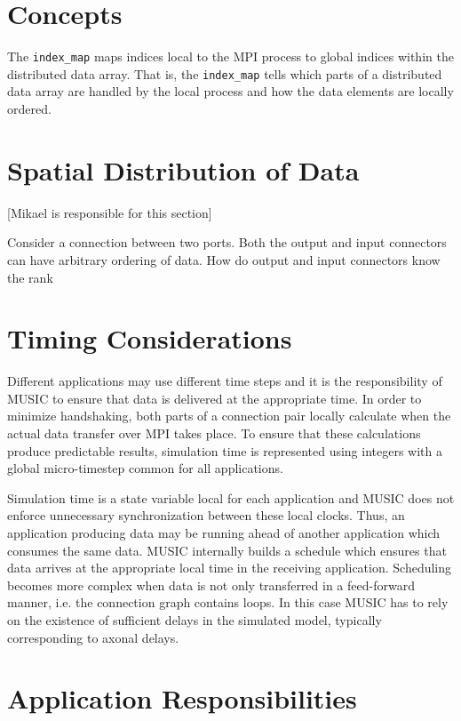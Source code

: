 \documentclass[a4paper]{report}
\newcommand{\responsible}[1]%
{{\color{red}[#1 is responsible for this section]}}
\begin{document}
\section{Concepts}

The \lstinline|index_map| maps indices local to the MPI process to global
indices within the distributed data array.  That is, the
\lstinline|index_map| tells which parts of a distributed data array are
handled by the local process and how the data elements are locally
ordered.

\section{Spatial Distribution of Data}
\responsible{Mikael}

Consider a connection between two ports.  Both the output and input
connectors can have arbitrary ordering of data.  How do output and
input connectors know the rank

\section{Timing Considerations}

Different applications may use different time steps and it is the
responsibility of MUSIC to ensure that data is delivered at the
appropriate time.  In order to minimize handshaking, both parts of a
connection pair locally calculate when the actual data transfer over
MPI takes place.  To ensure that these calculations produce
predictable results, simulation time is represented using integers
with a global micro-timestep common for all applications.

Simulation time is a state variable local for each application and
MUSIC does not enforce unnecessary synchronization between these local
clocks.  Thus, an application producing data may be running ahead of
another application which consumes the same data.  MUSIC internally
builds a schedule which ensures that data arrives at the appropriate
local time in the receiving application.  Scheduling becomes more
complex when data is not only transferred in a feed-forward manner,
i.e. the connection graph contains loops.  In this case MUSIC has to
rely on the existence of sufficient delays in the simulated model,
typically corresponding to axonal delays.


\section{Application Responsibilities}
\end{document}
